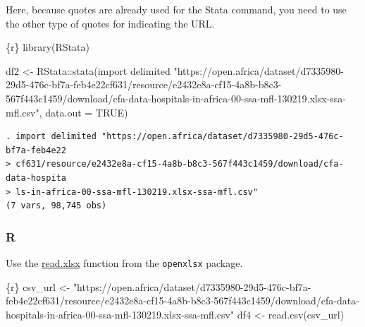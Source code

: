 \documentclass[
  letterpaper,
  DIV=11,
  numbers=noendperiod]{scrreprt}
\newenvironment{Shaded}{\begin{snugshade}}{\end{snugshade}}
\newcommand{\AttributeTok}[1]{\textcolor[rgb]{0.40,0.45,0.13}{#1}}
\newcommand{\ConstantTok}[1]{\textcolor[rgb]{0.56,0.35,0.01}{#1}}
\newcommand{\FunctionTok}[1]{\textcolor[rgb]{0.28,0.35,0.67}{#1}}
\newcommand{\InformationTok}[1]{\textcolor[rgb]{0.37,0.37,0.37}{#1}}
\newcommand{\NormalTok}[1]{\textcolor[rgb]{0.00,0.23,0.31}{#1}}
\newcommand{\OtherTok}[1]{\textcolor[rgb]{0.00,0.23,0.31}{#1}}
\newcommand{\SpecialCharTok}[1]{\textcolor[rgb]{0.37,0.37,0.37}{#1}}
\newcommand{\StringTok}[1]{\textcolor[rgb]{0.13,0.47,0.30}{#1}}
\begin{document}
Here, because quotes are already used for the Stata command, you need to
use the other type of quotes for indicating the URL.

\begin{Shaded}
\begin{Highlighting}[]
\InformationTok{\textasciigrave{}\textasciigrave{}\textasciigrave{}\{r\}}
\FunctionTok{library}\NormalTok{(RStata)}

\NormalTok{df2 }\OtherTok{\textless{}{-}}\NormalTok{ RStata}\SpecialCharTok{::}\FunctionTok{stata}\NormalTok{(}\StringTok{\textquotesingle{}import delimited "https://open.africa/dataset/d7335980{-}29d5{-}476c{-}bf7a{-}feb4e22cf631/resource/e2432e8a{-}cf15{-}4a8b{-}b8c3{-}567f443c1459/download/cfa{-}data{-}hospitals{-}in{-}africa{-}00{-}ssa{-}mfl{-}130219.xlsx{-}ssa{-}mfl.csv"\textquotesingle{}}\NormalTok{,}
                     \AttributeTok{data.out =} \ConstantTok{TRUE}\NormalTok{)}
\InformationTok{\textasciigrave{}\textasciigrave{}\textasciigrave{}}
\end{Highlighting}
\end{Shaded}

\begin{verbatim}
. import delimited "https://open.africa/dataset/d7335980-29d5-476c-bf7a-feb4e22
> cf631/resource/e2432e8a-cf15-4a8b-b8c3-567f443c1459/download/cfa-data-hospita
> ls-in-africa-00-ssa-mfl-130219.xlsx-ssa-mfl.csv"
(7 vars, 98,745 obs)
\end{verbatim}

\hypertarget{r-3}{%
\subsubsection{R}\label{r-3}}

Use the
\href{https://www.rdocumentation.org/packages/openxlsx/versions/4.2.5/topics/read.xlsx}{read.xlsx}
function from the \texttt{openxlsx} package.

\begin{Shaded}
\begin{Highlighting}[]
\InformationTok{\textasciigrave{}\textasciigrave{}\textasciigrave{}\{r\}}
\NormalTok{csv\_url }\OtherTok{\textless{}{-}} \StringTok{"https://open.africa/dataset/d7335980{-}29d5{-}476c{-}bf7a{-}feb4e22cf631/resource/e2432e8a{-}cf15{-}4a8b{-}b8c3{-}567f443c1459/download/cfa{-}data{-}hospitals{-}in{-}africa{-}00{-}ssa{-}mfl{-}130219.xlsx{-}ssa{-}mfl.csv"}
\NormalTok{df4 }\OtherTok{\textless{}{-}} \FunctionTok{read.csv}\NormalTok{(csv\_url)}
\InformationTok{\textasciigrave{}\textasciigrave{}\textasciigrave{}}
\end{Highlighting}
\end{Shaded}
\end{document}
